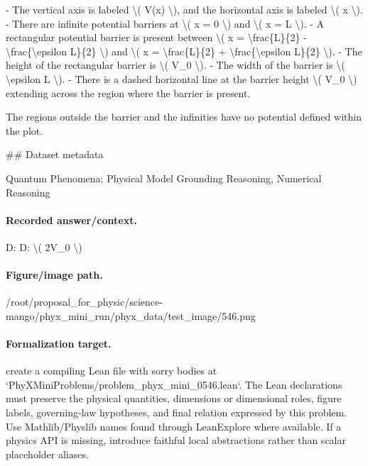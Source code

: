 - The vertical axis is labeled \textbackslash{}( V(x) \textbackslash{}), and the horizontal axis is labeled \textbackslash{}( x \textbackslash{}).
- There are infinite potential barriers at \textbackslash{}( x = 0 \textbackslash{}) and \textbackslash{}( x = L \textbackslash{}).
- A rectangular potential barrier is present between \textbackslash{}( x = \textbackslash{}frac\{L\}\{2\} - \textbackslash{}frac\{\textbackslash{}epsilon L\}\{2\} \textbackslash{}) and \textbackslash{}( x = \textbackslash{}frac\{L\}\{2\} + \textbackslash{}frac\{\textbackslash{}epsilon L\}\{2\} \textbackslash{}).
- The height of the rectangular barrier is \textbackslash{}( V\_0 \textbackslash{}).
- The width of the barrier is \textbackslash{}( \textbackslash{}epsilon L \textbackslash{}).
- There is a dashed horizontal line at the barrier height \textbackslash{}( V\_0 \textbackslash{}) extending across the region where the barrier is present.

The regions outside the barrier and the infinities have no potential defined within the plot.

\#\# Dataset metadata

Quantum Phenomena; Physical Model Grounding Reasoning, Numerical Reasoning

\paragraph{Recorded answer/context.}
D: D: \textbackslash{}( 2V\_0 \textbackslash{})

\paragraph{Figure/image path.}
/root/proposal\_for\_physic/science-mango/phyx\_mini\_run/phyx\_data/test\_image/546.png

\paragraph{Formalization target.}
create a compiling Lean file with sorry bodies at `PhyXMiniProblems/problem\_phyx\_mini\_0546.lean`. The Lean declarations must preserve the physical quantities, dimensions or dimensional roles, figure labels, governing-law hypotheses, and final relation expressed by this problem.
Use Mathlib/Physlib names found through LeanExplore where available. If a physics API is missing, introduce faithful local abstractions rather than scalar placeholder aliases.

